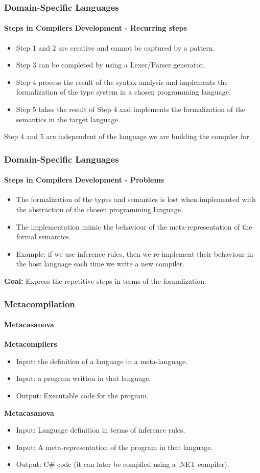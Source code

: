 \documentclass[10pt,a4paper]{beamer}
\begin{document}
\begin{frame}
\frametitle{Domain-Specific Languages}
\framesubtitle{Steps in Compilers Development - Recurring steps}
\begin{itemize}
	\item Step 1 and 2 are creative and cannot be captured by a pattern.
	\item Step 3 can be completed by using a Lexer/Parser generator.
	\item Step 4 process the result of the syntax analysis and implements the formalization of the type system in a chosen programming language.
	\item Step 5 takes the result of Step 4 and implements the formalization of the semantics in the target language.
\end{itemize}

Step 4 and 5 are independent of the language we are building the compiler for.
\end{frame}

\begin{frame}
\frametitle{Domain-Specific Languages}
\framesubtitle{Steps in Compilers Development - Problems}
\begin{itemize}
	\item The formalization of the types and semantics is lost when implemented with the abstraction of the chosen programming language.
	\item The implementation mimic the behaviour of the meta-representation of the formal semantics.
	\item Example: if we use inference rules, then we re-implement their behaviour in the host language each time we write a new compiler.
\end{itemize}

\textbf{Goal:} Express the repetitive steps in terms of the formalization.
\end{frame}

\begin{frame}
\frametitle{Metacompilation}
\framesubtitle{Metacasanova}

\textbf{Metacompilers}
\begin{itemize}
	\item Input: the definition of a language in a meta-language.
	\item Input: a program written in that language.
	\item Output: Executable code for the program.
\end{itemize}

\textbf{Metacasanova}
\begin{itemize}
	\item Input: Language definition in terms of inference rules.
	\item Input: A meta-representation of the program in that language.
	\item Output: C\# code (it can later be compiled using a .NET compiler).
\end{itemize}
\end{frame}
\end{document}
